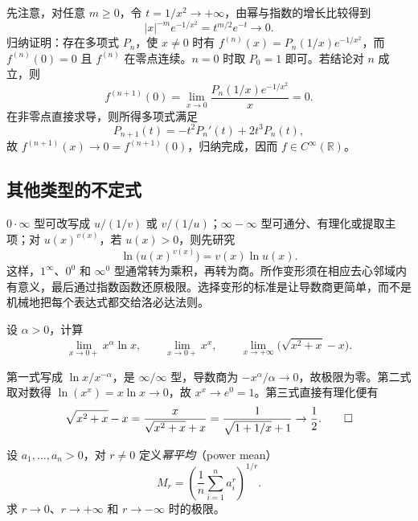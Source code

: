 \documentclass[UTF8,12pt,a4paper,fontset=fandol]{ctexbook}
\begin{document}
\begin{solve}
先注意，对任意 $m\geq0$，令 $t=1/x^2\to+\infty$，由幂与指数的增长比较得到
\[
    |x|^{-m}e^{-1/x^2}=t^{m/2}e^{-t}\to0.
\]
归纳证明：存在多项式 $P_n$，使 $x\neq0$ 时有 $f^{(n)}(x)=P_n(1/x)e^{-1/x^2}$，而 $f^{(n)}(0)=0$ 且 $f^{(n)}$ 在零点连续。$n=0$ 时取 $P_0=1$ 即可。若结论对 $n$ 成立，则
\[
    f^{(n+1)}(0)=\lim_{x\to0}\frac{P_n(1/x)e^{-1/x^2}}x=0.
\]
在非零点直接求导，则所得多项式满足
\[
    P_{n+1}(t)=-t^2P_n'(t)+2t^3P_n(t),
\]
故 $f^{(n+1)}(x)\to0=f^{(n+1)}(0)$，归纳完成，因而 $f\in C^\infty(\mathbb{R})$。
\end{solve}

\subsection{其他类型的不定式}
\label{subsec:other-indeterminate-forms}

$0\cdot\infty$ 型可改写成 $u/(1/v)$ 或 $v/(1/u)$；$\infty-\infty$ 型可通分、有理化或提取主项；对 $u(x)^{v(x)}$，若 $u(x)>0$，则先研究
\[
    \ln\bigl(u(x)^{v(x)}\bigr)=v(x)\ln u(x).
\]
这样，$1^\infty$、$0^0$ 和 $\infty^0$ 型通常转为乘积，再转为商。所作变形须在相应去心邻域内有意义，最后通过指数函数还原极限。选择变形的标准是让导数商更简单，而不是机械地把每个表达式都交给洛必达法则。

\begin{example}
\label{ex:other-indeterminate-form-transformations}
设 $\alpha>0$，计算
\[
    \lim_{x\to0+}x^\alpha\ln x,
    \qquad \lim_{x\to0+}x^x,
    \qquad \lim_{x\to+\infty}\bigl(\sqrt{x^2+x}-x\bigr).
\]
\end{example}

\begin{solve}
第一式写成 $\ln x/x^{-\alpha}$，是 $\infty/\infty$ 型，导数商为 $-x^\alpha/\alpha\to0$，故极限为零。第二式取对数得 $\ln(x^x)=x\ln x\to0$，故 $x^x\to e^0=1$。第三式直接有理化便有
\[
    \sqrt{x^2+x}-x
    =\frac{x}{\sqrt{x^2+x}+x}
    =\frac1{\sqrt{1+1/x}+1}\to\frac12.
    \qedhere
\]
\end{solve}

\begin{example}
\label{ex:power-means-parameter-limits}
设 $a_1,\ldots,a_n>0$，对 $r\neq0$ 定义\emph{幂平均}（power mean）
\[
    M_r=\left(\frac1n\sum_{i=1}^n a_i^r\right)^{1/r}.
\]
求 $r\to0$、$r\to+\infty$ 和 $r\to-\infty$ 时的极限。
\end{example}
\end{document}
